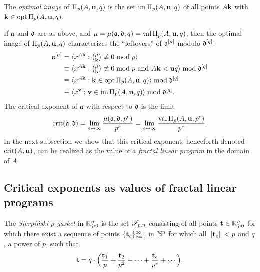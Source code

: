 \documentclass[11pt]{amsart}
\begin{document}
\begin{definition}
The \emph{optimal image} of $\Pi_p(A, \mathbf{u}, q)$ is the set $\operatorname{im} \Pi_p(A, \mathbf{u}, q)$ of all points  $A \mathbf{k}$ with $\mathbf{k} \in \operatorname{opt} \Pi_p(A, \mathbf{u}, q)$.
\end{definition}

If $\mathfrak{a}$ and $\mathfrak{d}$ are as above, and $\mu = \mu(\mathfrak{a},\mathfrak{d},q) = \operatorname{val} \Pi_p(A,\mathbf{u},q)$, then the optimal image of $\Pi_p(A,\mathbf{u},q)$ characterizes the ``leftovers'' of $\mathfrak{a}^{[\mu]}$ modulo $\mathfrak{d}^{[q]}$:
\begin{align*}
  \mathfrak{a}^{[\mu]} &= \langle x^{A\mathbf{k}}: \textstyle\binom{\mu}{\mathbf{k}} \not\equiv 0 \bmod{p} \rangle\\
  &\equiv \langle x^{A\mathbf{k}}: \textstyle\binom{\mu}{\mathbf{k}} \not\equiv 0 \bmod{p}\text{ and } A\mathbf{k} <\mathbf{u}q \rangle \bmod \mathfrak{d}^{[q]}\\
  &\equiv \langle x^{A\mathbf{k}}: \mathbf{k}\in \operatorname{opt}\Pi_p(A,\mathbf{u},q) \rangle \bmod \mathfrak{d}^{[q]}\\
  &\equiv \langle x^{\mathbf{v}}: \mathbf{v} \in \operatorname{im} \Pi_p(A,\mathbf{u},q) \rangle \bmod \mathfrak{d}^{[q]}.
\end{align*}
The critical exponent of $\mathfrak{a}$ with respect to $\mathfrak{d}$ is the limit
\begin{equation*}
\operatorname{crit}(\mathfrak{a},\mathfrak{d}) = \lim_{e\to\infty} \frac{\mu(\mathfrak{a},\mathfrak{d},p^e)}{p^e} = \lim_{e\to\infty} \frac{\operatorname{val} \Pi_p(A,\mathbf{u},p^e)}{p^e}.
\end{equation*}
In the next subsection we show that this critical exponent, henceforth denoted $\operatorname{crit}(A,\mathbf{u})$, can be realized as the value of a \emph{fractal linear program} in the domain of $A$.

\subsection{Critical exponents as values of fractal linear programs}

\begin{definition}
   The \emph{Sierpi\'nski $p$-gasket} in $\mathbb{R}_{\geqslant 0}^n$ is the set $\mathscr{S}_{p,n}$ consisting of all points $\mathbf{t}\in \mathbb{R}_{\geqslant 0}^n$ for which there exist a sequence of points $\{ \mathbf{t}_e \}_{e=1}^\infty$ in $\mathbb{N}^n$ for which all $\| \mathbf{t}_e \| < p$ and $q$, a power of $p$, such that
 \[
\mathbf{t} = q\cdot\Big(\frac{\mathbf{t}_1}{p} +\frac{\mathbf{t}_2}{p^2}+\cdots +\frac{\mathbf{t}_e}{p^e} + \cdots \Big).
 \]
\end{definition}
\end{document}
